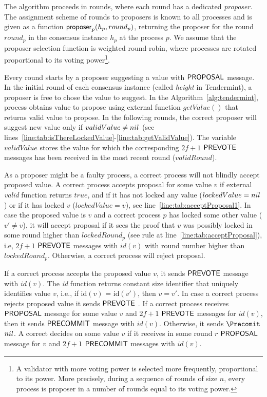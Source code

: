 The algorithm proceeds in rounds, where each round has a dedicated \emph{proposer}. The assignment scheme of rounds to proposers is known to all processes and is given as a function $\mathsf{proposer}_p(h_p, round_p)$, returning the proposer for the round $round_p$ in the consensus instance $h_p$ at the process $p$. We assume that the proposer selection function is weighted round-robin, where processes are rotated proportional to its voting power\footnote{A validator with more voting power is selected more frequently, proportional to its power. More precisely, during a sequence of rounds of size $n$, every process is proposer in a number of rounds equal to its voting power.}. 

Every round starts by a proposer suggesting a value with $\mathsf{PROPOSAL}$ message. In the initial round of each consensus instance (called \emph{height} in Tendermint), a proposer is free to chose the value to suggest. In the Algorithm~\ref{alg:tendermint}, process obtains value to propose using external function    
$getValue()$ that returns valid value to propose. In the following rounds, the correct proposer will suggest new value only if $validValue \neq nil$ (see lines~\ref{line:tab:isThereLockedValue}-\ref{line:tab:getValidValue}). The variable $validValue$ stores the value for which the corresponding $2f+1$ $\mathsf{PREVOTE}$ messages has been received in the most recent round ($validRound$). 

As a proposer might be a faulty process, a correct process will not blindly accept proposed value. A correct process accepts proposal for some value $v$ if external \emph{valid} function returns $true$, and if it has not locked any value ($lockedValue = nil$) or if it has locked $v$ ($lockedValue = v$), see line~\ref{line:tab:acceptProposal1}. In case the proposed value is $v$ and a correct process $p$ has locked some other value ($v' \neq v$), it will accept proposal if it sees the proof that $v$ was possibly locked in some round higher than $lockedRound_p$ (see rule at line~\ref{line:tab:acceptProposal}), i.e, $2f+1$ $\mathsf{PREVOTE}$ messages with $id(v)$ with round number higher than $lockedRound_p$. Otherwise, a correct process will reject proposal.

If a correct process accepts the proposed value $v$, it sends $\mathsf{PREVOTE}$ message with $id(v)$. The \emph{id} function returns constant size identifier that uniquely identifies value $v$, i.e., if id$(v)$ = id$(v')$, then $v=v'$. In case a correct process rejects proposed value it sends $\mathsf{PREVOTE}$ \nil.  If a correct process receives $\mathsf{PROPOSAL}$ message for some value $v$ and $2f+1$ $\mathsf{PREVOTE}$
messages for $id(v)$, then it sends $\mathsf{PRECOMMIT}$ message with $id(v)$. Otherwise, it sends $\Precomit$ $nil$. A correct decides on some value $v$ if it receives in some round $r$ $\mathsf{PROPOSAL}$ message for $v$ and $2f+1$ $\mathsf{PRECOMMIT}$ messages with $id(v)$.

